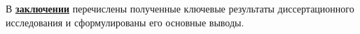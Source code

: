 \newpage

В \underline{\textbf{заключении}} перечислены полученные ключевые результаты диссертационного исследования и сформулированы его основные выводы.



\insertbibliofull   
{}














































